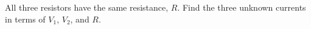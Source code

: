 All three resistors have the same resistance, $R$. Find the
three unknown currents in terms of $V_1$, $V_2$, and $R$.
        \answercheck
